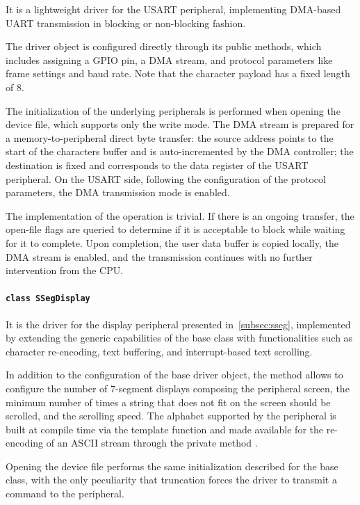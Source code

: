 It is a lightweight driver for the USART peripheral, implementing DMA-based UART transmission in blocking or non-blocking fashion.

The driver object is configured directly through its public methods, which includes assigning a GPIO pin, a DMA stream, and protocol parameters like frame settings and baud rate. Note that the character payload has a fixed length of \qty{8}{\bit}.

The initialization of the underlying peripherals is performed when opening the device file, which supports only the write mode. The DMA stream is prepared for a memory-to-peripheral direct byte transfer: the source address points to the start of the characters buffer and is auto-incremented by the DMA controller; the destination is fixed and corresponds to the data register of the USART peripheral. On the USART side, following the configuration of the protocol parameters, the DMA transmission mode is enabled.

The implementation of the  operation is trivial. If there is an ongoing transfer, the open-file flags are queried to determine if it is acceptable to block while waiting for it to complete. Upon completion, the user data buffer is copied locally, the DMA stream is enabled, and the transmission continues with no further intervention from the CPU.

\paragraph{\texttt{class SSegDisplay}}

It is the driver for the display peripheral presented in~\cref{subsec:sseg}, implemented by extending the generic capabilities of the  base class with functionalities such as character re-encoding, text buffering, and interrupt-based text scrolling.

In addition to the configuration of the base driver object, the method  allows to configure the number of 7-segment displays composing the peripheral screen, the minimum number of times a string that does not fit on the screen should be scrolled, and the scrolling speed.
The alphabet supported by the peripheral is built at compile time via the template function  and made available for the re-encoding of an ASCII stream through the private method .

Opening the device file performs the same initialization described for the base class, with the only peculiarity that truncation forces the driver to transmit a  command to the peripheral.

